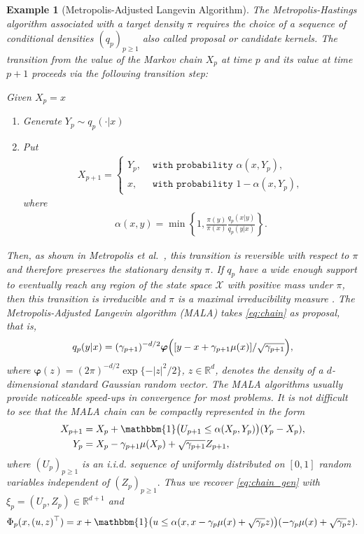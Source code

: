 \documentclass[aap,preprint]{imsart}
\newtheorem{example}{Example}
\begin{document}
\begin{example}[Metropolis-Adjusted Langevin Algorithm]
The Metropolis-Hastings algorithm
associated with a target density \(\pi\) requires the choice of a sequence of conditional densities  \((q_p)_{p\geq 1}\) also called proposal or candidate kernels. The transition from the value  of the Markov chain \(X_p\)  at time \(p\)
and its value at time \(p + 1\) proceeds via the following transition step:

\begin{algorithm}[H]
Given \(X_p=x\)\;
\begin{enumerate}
\item Generate \(Y_p\sim q_p(\cdot|x)\)\;
\item Put
\begin{eqnarray*}
X_{p+1}=
\begin{cases}
Y_p, & \texttt{ with probability } \alpha(x,Y_p),
\\
x, &  \texttt{ with probability } 1-\alpha(x,Y_p),
\end{cases}
\end{eqnarray*}
where
\begin{eqnarray*}
\alpha(x,y)=\min\left\{1,\frac{\pi(y)}{\pi(x)}\frac{q_p(x|y)}{q_p(y|x)}\right\}.
\end{eqnarray*}
\end{enumerate}
\end{algorithm}
Then, as shown in Metropolis et al.~\cite{metropolis1953equation}, this transition is reversible with respect to \(\pi\) and therefore preserves the stationary density \(\pi\). If \(q_p\) have a wide enough
support to eventually reach any region
of the state space \(\mathcal{X}\) with positive mass
under \(\pi\), then this transition is irreducible and $\pi$ is a maximal irreducibility measure \cite{mengersen:tweedie:1996}. The  Metropolis-Adjusted Langevin algorithm (MALA) takes  \eqref{eq:chain} as proposal, that is,
\begin{eqnarray*}
q_p(y|x)=(\gamma_{p+1})^{-d/2}\boldsymbol{\varphi}\Bigl([y-x+\gamma_{p+1}\mu(x)]/\sqrt{\gamma_{p+1}}\Bigr),
\end{eqnarray*}
where
$\boldsymbol{\varphi}(z)=(2\pi)^{-d/2} \exp\{-|z|^2/2\}$,
$z\in\mathbb R^d$, denotes the density of a $d$-dimensional
standard Gaussian random vector.  The MALA algorithms usually provide noticeable speed-ups in convergence for most problems. It is not difficult to see that the MALA chain can be compactly represented in the form
\begin{align*}
X_{p+1} &=X_p+\mathbbm{1}\bigl(U_{p+1}\leq \alpha(X_{p},Y_{p})\bigr)(Y_{p}-X_p),  \\
Y_{p}&=X_p-\gamma_{p+1}\mu(X_p)+\sqrt{\gamma_{p+1}}Z_{p+1},
\end{align*}
where \((U_{p})_{p\geq 1}\) is an i.i.d. sequence of uniformly distributed on \([0,1]\) random variables independent of \((Z_p)_{p\geq 1}.\) Thus we recover \eqref{eq:chain_gen} with  \(\xi_p=(U_p,Z_p)\in \mathbb{R}^{d+1}\) and
\begin{eqnarray*}
\Phi_p(x,(u,z)^\top)=x+\mathbbm{1}\bigl(u\leq \alpha(x,x-\gamma_{p}\mu(x)+\sqrt{\gamma_{p}}z)\bigr)(-\gamma_{p}\mu(x)+\sqrt{\gamma_{p}}z).
\end{eqnarray*}
\end{example}
\end{document}
